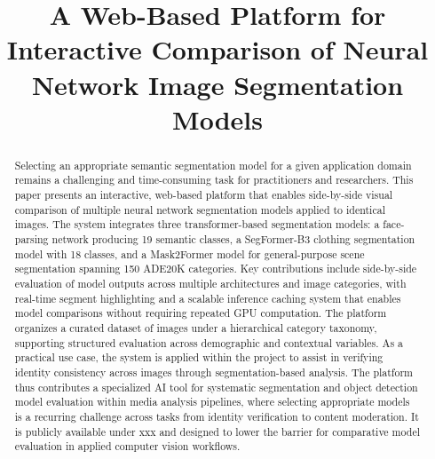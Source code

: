 \documentclass[conference,a4paper,flushend]{iaria}
\begin{document}
\title{A Web-Based Platform for Interactive Comparison of Neural Network Image Segmentation Models}


\maketitle

\begin{abstract}
Selecting an appropriate semantic segmentation model for a given application domain remains a challenging and time-consuming task for practitioners and researchers. This paper presents an interactive, web-based platform that enables side-by-side visual comparison of multiple neural network segmentation models applied to identical images. The system integrates three transformer-based segmentation models: a face-parsing network producing 19 semantic classes, a SegFormer-B3 clothing segmentation model with 18 classes, and a Mask2Former model for general-purpose scene segmentation spanning 150 ADE20K categories. Key contributions include side-by-side evaluation of model outputs across multiple architectures and image categories, with real-time segment highlighting and a scalable inference caching system that enables model comparisons without requiring repeated GPU computation. The platform organizes a curated dataset of images under a hierarchical category taxonomy, supporting structured evaluation across demographic and contextual variables. As a practical use case, the system is applied within the  project to assist in verifying identity consistency across images through segmentation-based analysis. The platform thus contributes a specialized AI tool for systematic segmentation and object detection model evaluation within media analysis pipelines, where selecting appropriate models is a recurring challenge across tasks from identity verification to content moderation. It is publicly available under xxx and designed to lower the barrier for comparative model evaluation in applied computer vision workflows.
\end{abstract}
\end{document}
